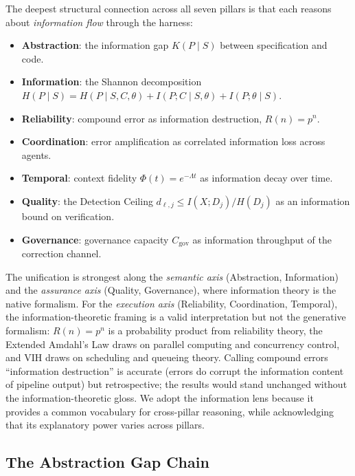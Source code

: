 \documentclass[11pt, a4paper]{googledeepmind}
\begin{document}
The deepest structural connection across all seven pillars is that each reasons about \emph{information flow} through the harness:

\begin{itemize}[nosep]
    \item \textbf{Abstraction}: the information gap $K(P \mid S)$ between specification and code.
    \item \textbf{Information}: the Shannon decomposition $H(P \mid S) = H(P \mid S,C,\theta) + I(P;C \mid S,\theta) + I(P;\theta \mid S)$.
    \item \textbf{Reliability}: compound error as information destruction, $R(n) = p^n$.
    \item \textbf{Coordination}: error amplification as correlated information loss across agents.
    \item \textbf{Temporal}: context fidelity $\Phi(t) = e^{-\Lambda t}$ as information decay over time.
    \item \textbf{Quality}: the Detection Ceiling $d_{\ell,j} \leq I(X; D_j)/H(D_j)$ as an information bound on verification.
    \item \textbf{Governance}: governance capacity $C_{\text{gov}}$ as information throughput of the correction channel.
\end{itemize}

The unification is strongest along the \emph{semantic axis} (Abstraction, Information) and the \emph{assurance axis} (Quality, Governance), where information theory is the native formalism. For the \emph{execution axis} (Reliability, Coordination, Temporal), the information-theoretic framing is a valid interpretation but not the generative formalism: $R(n) = p^n$ is a probability product from reliability theory, the Extended Amdahl's Law draws on parallel computing and concurrency control, and VIH draws on scheduling and queueing theory. Calling compound errors ``information destruction'' is accurate (errors do corrupt the information content of pipeline output) but retrospective; the results would stand unchanged without the information-theoretic gloss. We adopt the information lens because it provides a common vocabulary for cross-pillar reasoning, while acknowledging that its explanatory power varies across pillars.

\subsection{The Abstraction Gap Chain}
\end{document}
